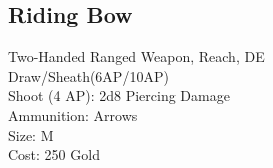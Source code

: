 \subsection{Riding Bow}\label{weapon:ridingBow}
Two-Handed Ranged Weapon,  Reach, DE\\
Draw/Sheath(6AP/10AP)\\
Shoot (4 AP): 2d8 Piercing Damage\\
Ammunition: Arrows\\
Size: M\\
Cost: 250 Gold\\